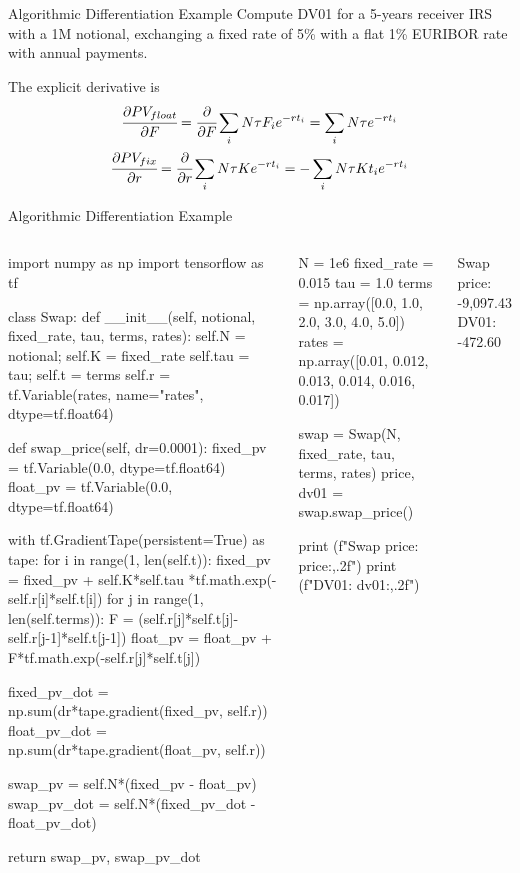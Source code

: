 \documentclass{beamer}
\begin{document}
\begin{frame}[fragile]{Algorithmic Differentiation Example}
Compute DV01 for a 5-years receiver IRS with a 1M notional, exchanging a fixed rate of 5\% with a flat 1\% EURIBOR rate with annual payments.

The explicit derivative is
\begin{equation*}
\begin{gathered}
\cfrac{\partial PV_{float}}{\partial F} = \cfrac{\partial}{\partial F}\sum_i N\tau F_i e^{-rt_i} = \sum_i N\tau e^{-rt_i} \\
\cfrac{\partial PV_{fix}}{\partial r} = \cfrac{\partial}{\partial r}\sum_i N\tau K e^{-rt_i} = -\sum_i N\tau K t_i e^{-rt_i}        
\end{gathered}
\end{equation*}
\end{frame}

\begin{frame}[fragile]{Algorithmic Differentiation Example}
\begin{columns}
\begin{ipython}
import numpy as np
import tensorflow as tf

class Swap:
  def __init__(self, notional, fixed_rate, tau, terms, rates):
    self.N = notional; self.K = fixed_rate
    self.tau = tau; self.t = terms
    self.r = tf.Variable(rates, name="rates", dtype=tf.float64)

  def swap_price(self, dr=0.0001):
    fixed_pv = tf.Variable(0.0, dtype=tf.float64)
    float_pv = tf.Variable(0.0, dtype=tf.float64)

    with tf.GradientTape(persistent=True) as tape:
      for i in range(1, len(self.t)):
        fixed_pv = fixed_pv + self.K*self.tau
                   *tf.math.exp(-self.r[i]*self.t[i])
      for j in range(1, len(self.terms)):
        F = (self.r[j]*self.t[j]-self.r[j-1]*self.t[j-1])
        float_pv = float_pv + F*tf.math.exp(-self.r[j]*self.t[j])
    
    fixed_pv_dot = np.sum(dr*tape.gradient(fixed_pv, self.r))
    float_pv_dot = np.sum(dr*tape.gradient(float_pv, self.r))

    swap_pv = self.N*(fixed_pv - float_pv)
    swap_pv_dot = self.N*(fixed_pv_dot - float_pv_dot)

    return swap_pv, swap_pv_dot
\end{ipython}
\begin{ipython}
N = 1e6
fixed_rate  = 0.015
tau         = 1.0
terms       = np.array([0.0, 1.0, 2.0, 3.0, 4.0, 5.0])
rates       = np.array([0.01, 0.012, 0.013, 0.014, 0.016, 0.017])

swap = Swap(N, fixed_rate, tau, terms, rates)
price, dv01 = swap.swap_price()

print (f"Swap price: {price:,.2f}")
print (f"DV01: {dv01:,.2f}")
\end{ipython}
\begin{ioutput}

Swap price: -9,097.43
DV01: -472.60
\end{ioutput}
\end{columns}
\end{frame}
\end{document}
